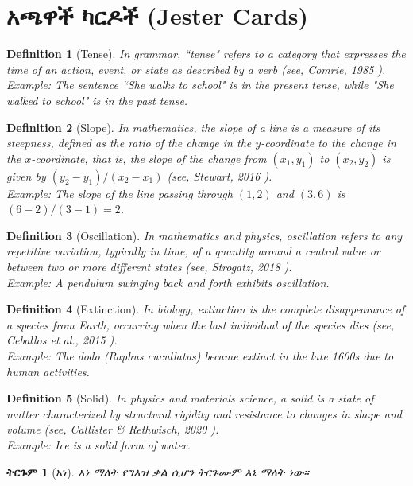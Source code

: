 \documentclass[a4paper,12pt]{article}
\newenvironment{geez}{\geezfont}{}
\theoremstyle{mystyle}
\newtheorem{definition}{Definition}
\newtheorem{amharicdefinition}{\begin{geez}ትርጉም\end{geez}}
\numberwithin{equation}{section}
\numberwithin{theorem}{section}
\numberwithin{proposition}{section}
\numberwithin{example}{section}
\numberwithin{remark}{section}
\numberwithin{lemma}{section}
\numberwithin{corollary}{section}
\numberwithin{definition}{section}
\numberwithin{amharicdefinition}{section}
\begin{document}
\section{\begin{geez}አጫዋች ካርዶች (Jester Cards)\end{geez}}
\label{S:2}
\begin{definition}[Tense]
In grammar, ``tense" refers to a category that expresses the time of an action, event, or state as described by a verb (see, Comrie, 1985 \cite{declerck1986reichenbach}).\\
Example: The sentence ``She walks to school" is in the present tense, while "She walked to school" is in the past tense.
\end{definition}
\begin{definition}[Slope]
In mathematics, the slope of a line is a measure of its steepness, defined as the ratio of the change in the $y$-coordinate to the change in the $x$-coordinate, that is, the slope of the change from $(x_1,y_1)$ to $(x_2,y_2)$ is given by $(y_2-y_1)/(x_2-x_1)$  (see, Stewart, 2016 \cite{stewart2016calculus}).\\
Example: The slope of the line passing through $(1,2)$ and $(3,6)$ is $(6-2)/(3-1)=2$.
\end{definition}
\begin{definition}[Oscillation]
In mathematics and physics, oscillation refers to any repetitive variation, typically in time, of a quantity around a central value or between two or more different states (see, Strogatz, 2018 \cite{strogatz2018nonlinear}).\\
Example: A pendulum swinging back and forth exhibits oscillation.
\end{definition}
\begin{definition}[Extinction]
In biology, extinction is the complete disappearance of a species from Earth, occurring when the last individual of the species dies (see, Ceballos et al., 2015 \cite{ceballos2017biological}).\\
Example: The dodo (Raphus cucullatus) became extinct in the late 1600s due to human activities.
\end{definition}
\begin{definition}[Solid]
In physics and materials science, a solid is a state of matter characterized by structural rigidity and resistance to changes in shape and volume (see, Callister \& Rethwisch, 2020 \cite{callister2020materials}).\\
Example: Ice is a solid form of water.
\end{definition}
\begin{amharicdefinition}[አነ]
\begin{geez}አነ ማለት የግእዝ ቃል ሲሆን ትርጉሙም እኔ ማለት ነው።\end{geez}
\end{amharicdefinition}
\end{document}
